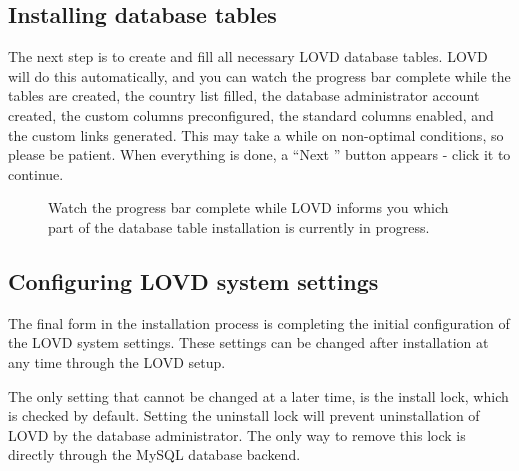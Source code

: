 \documentclass[a4paper,oneside,openany,12pt]{memoir}
\begin{document}
\subsection{Installing database tables}
The next step is to create and fill all necessary LOVD database tables.
LOVD will do this automatically, and you can watch the progress bar complete while the tables are created,
the country list filled, the database administrator account created, the custom columns preconfigured,
the standard columns enabled, and the custom links generated.
This may take a while on non-optimal conditions, so please be patient.
When everything is done, a ``Next \guillemotright'' button appears - click it to continue.

\begin{figure}[h]
  \begin{shaded}
  \caption{Watch the progress bar complete while LOVD informs you which part of the database table installation is currently in progress.}
  \end{shaded}
\end{figure}



\subsection{Configuring LOVD system settings}
The final form in the installation process is completing the initial configuration of the LOVD system settings.
These settings can be changed after installation at any time through the LOVD setup.
\par
The only setting that cannot be changed at a later time, is the install lock, which is checked by default.
Setting the uninstall lock will prevent uninstallation of LOVD by the database administrator.
The only way to remove this lock is directly through the MySQL database backend.
\end{document}
